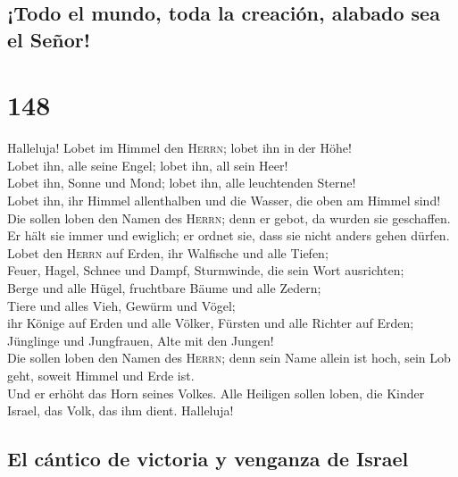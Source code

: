 \hypertarget{todo-el-mundo-toda-la-creaciuxf3n-alabado-sea-el-seuxf1or}{%
\subsection{¡Todo el mundo, toda la creación, alabado sea el
Señor!}\label{todo-el-mundo-toda-la-creaciuxf3n-alabado-sea-el-seuxf1or}}

\hypertarget{section-147}{%
\section{148}\label{section-147}}

 Halleluja! Lobet im Himmel den \textsc{Herrn}; lobet ihn
in der Höhe!\\
 Lobet ihn, alle seine Engel; lobet ihn, all sein Heer!\\
 Lobet ihn, Sonne und Mond; lobet ihn, alle leuchtenden
Sterne!\\
 Lobet ihn, ihr Himmel allenthalben und die Wasser, die
oben am Himmel sind!\\
 Die sollen loben den Namen des \textsc{Herrn}; denn er
gebot, da wurden sie geschaffen.\\
 Er hält sie immer und ewiglich; er ordnet sie, dass sie
nicht anders gehen dürfen.\\
 Lobet den \textsc{Herrn} auf Erden, ihr Walfische und
alle Tiefen;\\
 Feuer, Hagel, Schnee und Dampf, Sturmwinde, die sein Wort
ausrichten;\\
 Berge und alle Hügel, fruchtbare Bäume und alle Zedern;\\
 Tiere und alles Vieh, Gewürm und Vögel;\\
 ihr Könige auf Erden und alle Völker, Fürsten und alle
Richter auf Erden;\\
 Jünglinge und Jungfrauen, Alte mit den Jungen!\\
 Die sollen loben den Namen des \textsc{Herrn}; denn sein
Name allein ist hoch, sein Lob geht, soweit Himmel und Erde ist.\\
 Und er erhöht das Horn seines Volkes. Alle Heiligen
sollen loben, die Kinder Israel, das Volk, das ihm dient. Halleluja!

\hypertarget{el-cuxe1ntico-de-victoria-y-venganza-de-israel}{%
\subsection{El cántico de victoria y venganza de
Israel}\label{el-cuxe1ntico-de-victoria-y-venganza-de-israel}}

